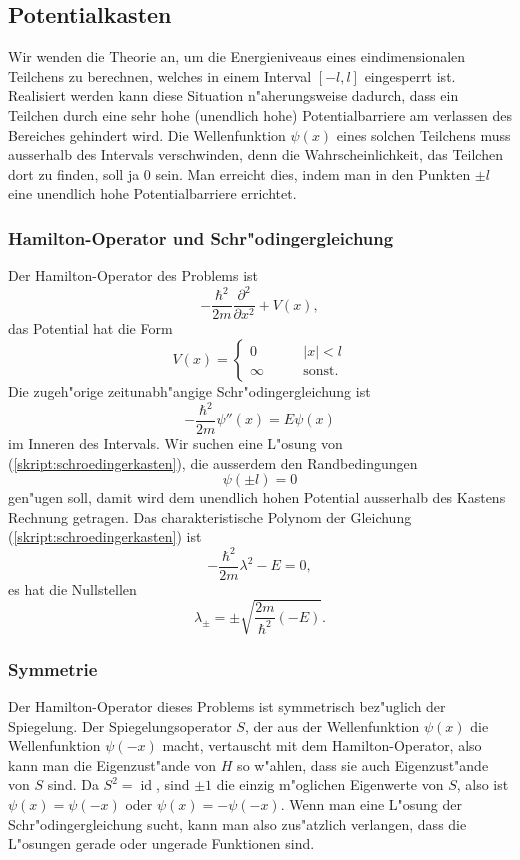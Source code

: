 \subsection{Potentialkasten\label{subsection:potentialkasten}}
Wir wenden die Theorie an, um die Energieniveaus eines eindimensionalen
Teilchens zu berechnen, welches in einem Interval $[-l,l]$ eingesperrt ist.
Realisiert werden kann diese Situation n"aherungsweise dadurch, dass 
ein Teilchen durch eine sehr hohe (unendlich hohe) Potentialbarriere
am verlassen des Bereiches gehindert wird.
Die Wellenfunktion $\psi(x)$ eines solchen Teilchens muss ausserhalb des
Intervals verschwinden, denn die Wahrscheinlichkeit, das Teilchen dort zu
finden, soll ja $0$ sein.
Man erreicht dies, indem man in den Punkten $\pm l$ eine unendlich
hohe Potentialbarriere errichtet.

\subsubsection{Hamilton-Operator und Schr"odingergleichung}
Der Hamilton-Operator des Problems ist
\[
-\frac{\hbar^2}{2m}\frac{\partial^2}{\partial x^2}+V(x),
\]
das Potential hat die Form
\[
V(x)=\begin{cases}
0&\qquad |x|<l\\
\infty&\qquad\text{sonst.}
\end{cases}
\]
Die zugeh"orige zeitunabh"angige Schr"odingergleichung ist
\begin{equation}
-\frac{\hbar^2}{2m}\psi''(x)=E\psi(x)
\label{skript:schroedingerkasten}
\end{equation}
im Inneren des Intervals.
Wir suchen eine L"osung von (\ref{skript:schroedingerkasten}),
die ausserdem den Randbedingungen
\[
\psi(\pm l)=0
\]
gen"ugen soll, damit wird dem unendlich hohen Potential ausserhalb des
Kastens Rechnung getragen.
Das charakteristische Polynom der Gleichung (\ref{skript:schroedingerkasten}) ist
\[
-\frac{\hbar^2}{2m}\lambda^2-E=0,
\]
es hat die Nullstellen
\[
\lambda_\pm = \pm\sqrt{\frac{2m}{\hbar^2}(-E)}.
\]

\subsubsection{Symmetrie}
Der Hamilton-Operator dieses Problems ist symmetrisch bez"uglich
der Spiegelung.
Der Spiegelungsoperator $S$, der aus der Wellenfunktion
$\psi(x)$ die Wellenfunktion $\psi(-x)$ macht, vertauscht mit
dem Hamilton-Operator, also kann man die Eigenzust"ande von $H$ so w"ahlen,
dass sie auch Eigenzust"ande von $S$ sind.
Da $S^2=\operatorname{id}$, sind $\pm1$ die einzig m"oglichen Eigenwerte
von $S$, also ist $\psi(x)=\psi(-x)$ oder $\psi(x)=-\psi(-x)$.
Wenn man eine L"osung der Schr"odingergleichung sucht, kann man also
zus"atzlich verlangen, dass die L"osungen gerade oder ungerade Funktionen
sind.

